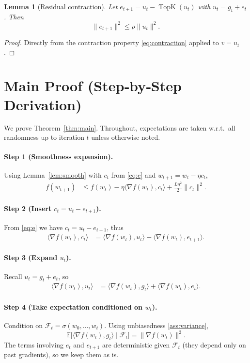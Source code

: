 \documentclass{article}
\newtheorem{lemma}{Lemma}
\newcommand{\E}{\mathbb{E}}
\newcommand{\topK}{\operatorname{TopK}}
\begin{document}
\begin{lemma}[Residual contraction]\label{lem:residual}
Let $e_{t+1}=u_t-\topK(u_t)$ with $u_t=g_t+e_t$.  Then
\[
\|e_{t+1}\|^{2}\le\rho\|u_t\|^{2}.
\]
\end{lemma}
\begin{proof}
Directly from the contraction property \eqref{eq:contraction} applied to $v=u_t$.
\end{proof}

\section*{Main Proof (Step‑by‑Step Derivation)}
We prove Theorem~\ref{thm:main}.  Throughout, expectations are taken w.r.t.\ all randomness up to iteration $t$ unless otherwise noted.

\paragraph{Step 1 (Smoothness expansion).}
Using Lemma~\ref{lem:smooth} with $c_t$ from \eqref{eq:c} and $w_{t+1}=w_t-\eta c_t$,
\begin{align}
f(w_{t+1})
&\le f(w_t)-\eta\langle\nabla f(w_t),c_t\rangle+\frac{L\eta^{2}}{2}\|c_t\|^{2}.
\tag{1}
\end{align}
\paragraph{Step 2 (Insert $c_t = u_t-e_{t+1}$).}
From \eqref{eq:e} we have $c_t = u_t-e_{t+1}$, thus
\begin{align}
\langle\nabla f(w_t),c_t\rangle
&= \langle\nabla f(w_t),u_t\rangle-\langle\nabla f(w_t),e_{t+1}\rangle.
\tag{2}
\end{align}
\paragraph{Step 3 (Expand $u_t$).}
Recall $u_t=g_t+e_t$, so
\begin{align}
\langle\nabla f(w_t),u_t\rangle
&= \langle\nabla f(w_t),g_t\rangle+\langle\nabla f(w_t),e_t\rangle.
\tag{3}
\end{align}
\paragraph{Step 4 (Take expectation conditioned on $w_t$).}
Condition on $\mathcal{F}_t\!=\!\sigma(w_0,\dots,w_t)$.
Using unbiasedness \ref{ass:variance},
\[
\E\bigl[\langle\nabla f(w_t),g_t\rangle\mid\mathcal{F}_t\bigr]
= \|\nabla f(w_t)\|^{2}.
\tag{4}
\]
The terms involving $e_t$ and $e_{t+1}$ are deterministic given $\mathcal{F}_t$ (they depend only on past gradients), so we keep them as is.
\end{document}
